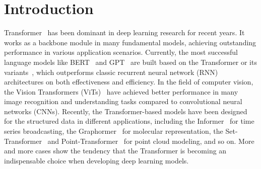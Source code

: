 \section{Introduction}\label{sec:intro}
Transformer~\cite{vaswani2017attention} has been dominant in deep learning research for recent years. 
It works as a backbone module in many fundamental models, achieving outstanding performance in various application scenarios. 
Currently, the most successful language models like BERT~\cite{devlin2019bert} and GPT~\cite{brown2020language} are built based on the Transformer or its variants~\cite{child2019generating,dai2019transformer}, which outperforms classic recurrent neural network (RNN) architectures on both effectiveness and efficiency. 
In the field of computer vision, the Vision Transformers (ViTs)~\cite{dosovitskiy2021an,liu2021swin,arnab2021vivit} have achieved better performance in many image recognition and understanding tasks compared to convolutional neural networks (CNNs).
Recently, the Transformer-based models have been designed for the structured data in different applications, including the Informer~\cite{zhang2021informer} for time series broadcasting, the Graphormer~\cite{ying2021transformers} for molecular representation, the Set-Transformer~\cite{lee2019set} and Point-Transformer~\cite{zhao2021point} for point cloud modeling, and so on.
More and more cases show the tendency that the Transformer is becoming an indispensable choice when developing deep learning models.

